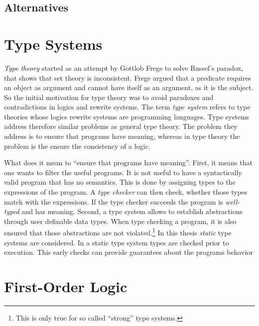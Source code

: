 \subsection{Alternatives}
\section{Type Systems}
\textit{Type theory} started as an attempt by Gottlob Frege to solve Russel's
paradox, that shows that \naive set theory is inconsistent. Frege
argued that a predicate requires an object as argument and cannot have
itself as an argument, as it is the subject. So the initial motivation for type theory was to avoid
paradoxes and contradictions in logics and rewrite systems. The term
\textit{type system} refers to type theories whose logics rewrite
systems are programming languages. Type systems address therefore
similar problems as general type theory. The problem they address is
to ensure that programs have meaning, whereas in type theory the
problem is the ensure the consistency of a logic.

What does it mean to ``ensure that programs have meaning''. First, it
means that one wants to filter the useful programs. It is not useful
to have a syntactically valid program that has no semantics. This is
done by assigning types to the expressions of the program. A
\textit{type checker} can then check, whether those types match with
the expressions. If the type checker succeeds the program is
\textit{well-typed} and has meaning. Second, a type system allows to
establish abstractions through user definable data types. When type
checking a program, it is also ensured that those abstractions are not
violated.\footnote{This is only true for so called ``strong'' type
  systems.} In this thesis \textit{static} type systems are
considered. In a static type system types are checked prior to
execution. This early checks can provide guarantees about the programs
behavior 
\section{First-Order Logic}

